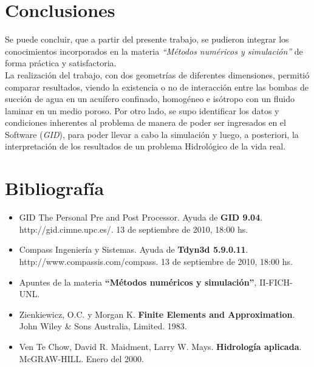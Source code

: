 \documentclass[10pt,a4paper,final]{article}
\begin{document}
\section{Conclusiones}
Se puede concluir, que a partir del presente trabajo, se pudieron integrar los conocimientos incorporados en la materia \emph{``Métodos numéricos y simulación''} de forma práctica y satisfactoria. \\
La realización del trabajo, con dos geometrías de diferentes dimensiones, permitió comparar resultados, viendo la existencia o no de interacción entre las bombas de succión de agua en un acuífero confinado, homogéneo e isótropo con un fluido laminar en un  medio poroso.
Por otro lado, se supo identificar los datos y condiciones inherentes al problema de manera de poder ser ingresados en el Software (\emph{GID}), para poder llevar a cabo la simulación y luego, a posteriori, la interpretación de los resultados de un problema Hidrológico de la vida real.
\section{Bibliografía}
  \begin{itemize}
  \item GID The Personal Pre and Post Processor. Ayuda de \textbf{GID 9.04}. http://gid.cimne.upc.es/. 13 de septiembre de 2010, 18:00 hs. 
  \item Compass Ingeniería y Sistemas. Ayuda de \textbf{Tdyn3d 5.9.0.11}. http://www.compassis.com/compass. 13 de septiembre de 2010, 18:00 hs.
  \item Apuntes de la materia \textbf{``Métodos numéricos y simulación''}, II-FICH-UNL.
  \item Zienkiewicz,  O.C. y Morgan K. \textbf{Finite Elements and Approximation}. John Wiley \& Sons Australia, Limited. 1983.
  \item Ven Te Chow, David R. Maidment, Larry W. Mays. \textbf{Hidrología aplicada}. McGRAW-HILL. Enero del 2000.
 \end{itemize}
\end{document}
